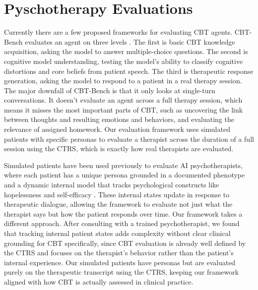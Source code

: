 \documentclass[twoside]{report}
\begin{document}
\section{Pyschotherapy Evaluations}
Currently there are a few proposed frameworks for evaluating CBT agents. CBT-Bench evaluates an agent on three levels \cite{zhang2025cbtbench}. The first is basic CBT knowledge acquisition, asking the model to answer multiple-choice questions. The second is cognitive model understanding, testing the model's ability to classify cognitive distortions and core beliefs from patient speech. The third is therapeutic response generation, asking the model to respond to a patient in a real therapy session. The major downfall of CBT-Bench is that it only looks at single-turn conversations. It doesn't evaluate an agent across a full therapy session, which means it misses the most important parts of CBT, such as uncovering the link between thoughts and resulting emotions and behaviors, and evaluating the relevance of assigned homework. Our evaluation framework uses simulated patients with specific personas to evaluate a therapist across the duration of a full session using the CTRS, which is exactly how real therapists are evaluated.

Simulated patients have been used previously to evaluate AI psychotherapists, where each patient has a unique persona grounded in a documented phenotype and a dynamic internal model that tracks psychological constructs like hopelessness and self-efficacy \cite{steenstra2025dissertation}. These internal states update in response to therapeutic dialogue, allowing the framework to evaluate not just what the therapist says but how the patient responds over time. Our framework takes a different approach. After consulting with a trained psychotherapist, we found that tracking internal patient states adds complexity without clear clinical grounding for CBT specifically, since CBT evaluation is already well defined by the CTRS and focuses on the therapist's behavior rather than the patient's internal experience. Our simulated patients have personas but are evaluated purely on the therapeutic transcript using the CTRS, keeping our framework aligned with how CBT is actually assessed in clinical practice.
\end{document}
